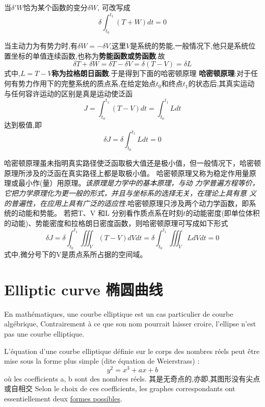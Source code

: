 \documentclass{book}
\begin{document}
当$\delta 'W$恰为某个函数的变分$\delta W$, \lasteq 可改写成
\begin{equation}
 \delta \int_{t_0}^{t_1}(T+W)dt=0
\end{equation}

当主动力为有势力时,有$\delta W=-\delta V$,这里$V$是系统的势能,一般情况下,他只是系统位置坐标的单值连续函数,也称为\textbf{势能函数或势函数}.故
\begin{equation}
 \delta T + \delta W =\delta T -\delta V =\delta (T-V)=\delta L
\end{equation}
式中,\textbf{$L=T-V$称为拉格朗日函数}.于是得到下面的哈密顿原理
\textbf{哈密顿原理}:对于任何有势力作用下的完整系统的质点系,在给定始点$t_0$和终点$t_1$的状态后,其真实运动与任何容许运动的区别是真是运动使泛函
\begin{equation}
 J=\int_{t_0}^{t_1}(T-V)dt=\int_{t_0}^{t_1}Ldt
\end{equation}
达到极值,即
\begin{equation}
 \delta J=\delta \int_{t_0}^{t_1}Ldt=0
\end{equation}

哈密顿原理虽未指明真实路径使泛函取极大值还是极小值，但一般情况下，哈密顿原理所涉及的泛函在真实路径上都是取极小值。
哈密顿原理又称为稳定作用量原理或最小作(量）用原理。\emph{该原理是力学中的基本原理，与动 力学普遍方程等价，它把力学原理化为更一般的形式，并且与坐标系的选择无关，在理论上具有意 义的普遍性，在应用上具有广泛的适应性.}哈密顿原理只涉及两个动力学函数，即系统的动能和势能。 若把T、V 和L 分别看作质点系在时刻$t$的动能密度(即单位体积的动能)、势能密度和拉格朗日密度函数，则哈密顿原理可写成如下形式
\begin{equation}
 \delta J=\delta \int_{t_0}^{t_1} \iiint_V (T-V)dVdt=\delta \int_{t_0}^{t_1} \iiint_V LdVdt =0
\end{equation}
式中,微分号下的V是质点系所占据的空间域。

\chapter{Elliptic curve 椭圆曲线}
En mathématiques, une courbe elliptique est un cas particulier de courbe algébrique,
Contrairement à ce que son nom pourrait laisser croire, l'ellipse n'est pas une courbe elliptique.

L'équation d'une courbe elliptique définie sur le corps des nombres réels peut être mise sous la forme plus simple (dite équation de Weierstrass) :
$$ y^2 = x^3 + ax + b $$
où les coefficients a, b sont des nombres réels.
其是无奇点的,亦即,其图形没有尖点或自相交
Selon le choix de ces coefficients, les graphes correspondants ont essentiellement deux \href{http://upload.wikimedia.org/wikipedia/commons/d/d0/ECClines-3.svg}{formes possibles}.
\end{document}
